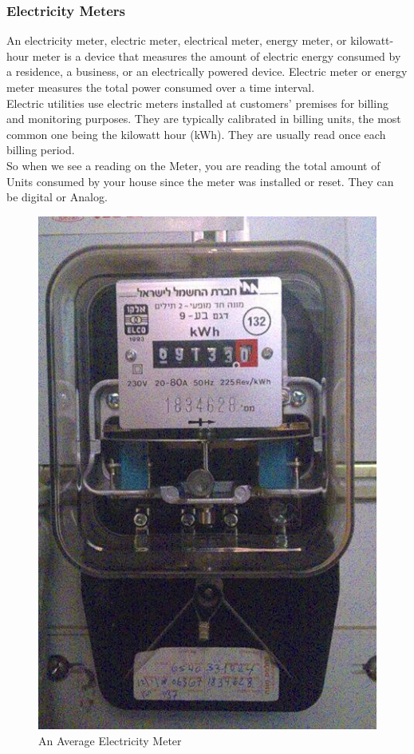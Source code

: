\documentclass[11pt,a4paper]{article}
\begin{document}
\subsubsection{Electricity Meters}
An electricity meter, electric meter, electrical meter, energy meter, or kilowatt-hour meter is a device that measures the amount of electric energy consumed by a residence, a business, or an electrically powered device. Electric meter or energy meter measures the total power consumed over a time interval.\\

Electric utilities use electric meters installed at customers' premises for billing and monitoring purposes. They are typically calibrated in billing units, the most common one being the kilowatt hour (kWh). They are usually read once each billing period.\\

So when we see a reading on the Meter, you are reading the total amount of Units consumed by your house since the meter was installed or reset. They can be digital or Analog. 

\begin{figure}[H]
	\centering
	\includegraphics[scale=0.3]{meters.jpg}
	\caption{An Average Electricity Meter}
\end{figure}
\end{document}
